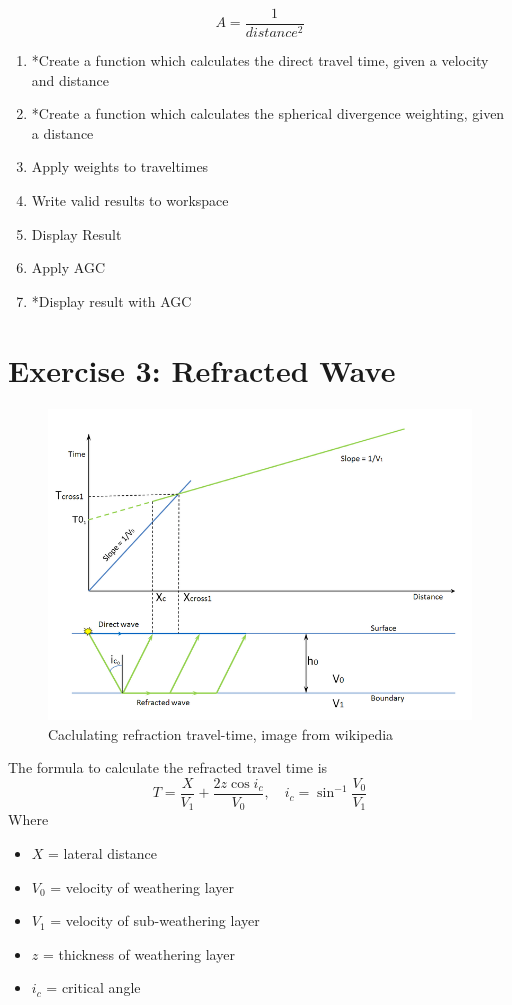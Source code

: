 \documentclass[a4paper, 10pt]{article}
\begin{document}
\[ A = \frac{1}{distance^2}\]

\begin{enumerate}
\item *Create a function which calculates the direct travel time, given a velocity and distance
\item *Create a function which calculates the spherical divergence weighting, given a distance
\item Apply weights to traveltimes
\item Write valid results to workspace
\item Display Result
\item Apply AGC
\item *Display result with AGC
\end{enumerate}

\newpage
\section*{Exercise 3: Refracted Wave}
\begin{figure}[h]
\centering
\includegraphics[scale=0.5]{800px-Refraction_2layers.png}
\caption{Caclulating refraction travel-time, image from wikipedia}
\end{figure}
The formula to calculate the refracted travel time is 
\[T = \frac{X}{V_1} + \frac{2z \cos{i_c}}{V_0}, \quad i_c = \sin^{-1}{\frac{V_0}{V_1}} \]
Where
\begin{itemize}
\item $X$ = lateral distance
\item $V_0$ = velocity of weathering layer
\item $V_1$ = velocity of sub-weathering layer
\item $z$ = thickness of weathering layer
\item $i_c$ = critical angle
\end{itemize}
\end{document}

